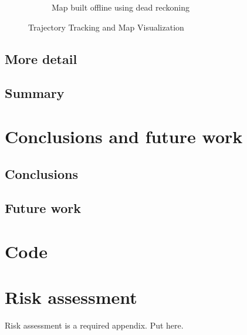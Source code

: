 \begin{figure}[H]
\begin{subfigure}[c]{0.6\textwidth}
            \caption{Map built offline using dead reckoning}
        \end{subfigure}
        \caption{Trajectory Tracking and Map Visualization}
        \label{fig:TrajTrack}
    \end{figure}
    \subsection{More detail}
    \subsection{Summary}
  \section{Conclusions and future work} %
    \subsection{Conclusions}
      \subsection{Future work}
    \printbibliography
  \begin{uomappendix} 
      \section{Code}
      \section{Risk assessment}
      Risk assessment is a required appendix. Put here.
  \end{uomappendix}
  
  